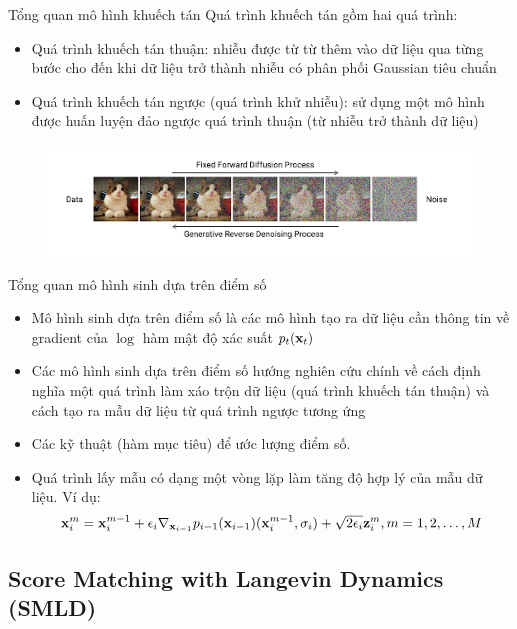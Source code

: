 \documentclass[10pt]{beamer}
\theoremstyle{remark}
\numberwithin{algocf}{section}
\numberwithin{equation}{section}
\numberwithin{dl}{section}
\numberwithin{figure}{section}
\begin{document}
\begin{frame}{Tổng quan mô hình khuếch tán}
	Quá trình khuếch tán gồm hai quá trình:
	\begin{itemize}
		\item Quá trình khuếch tán thuận: nhiễu được từ từ thêm vào dữ liệu qua từng bước cho đến khi dữ liệu trở thành nhiễu có phân phối Gaussian tiêu chuẩn
		\item Quá trình khuếch tán ngược (quá trình khử nhiễu): sử dụng một mô hình được huấn luyện đảo ngược quá trình thuận (từ nhiễu trở thành dữ liệu)
	\end{itemize}
	\begin{figure}[H]
		\centering
		\includegraphics[width=0.9\linewidth]{figures/Fixed_Forward_Diffusion_Process.png}
	\end{figure}
\end{frame}

\begin{frame}{Tổng quan mô hình sinh dựa trên điểm số}
	\begin{itemize}
		\item Mô hình sinh dựa trên điểm số là các mô hình tạo ra dữ liệu cần thông tin về gradient của $\log$ hàm mật độ xác suất $p_t(\bold{x}_t)$
		\item Các mô hình sinh dựa trên điểm số hướng nghiên cứu chính về cách định nghĩa một quá trình làm xáo trộn dữ liệu (quá trình khuếch tán thuận) và cách tạo ra mẫu dữ liệu từ quá trình ngược tương ứng
		\item Các kỹ thuật (hàm mục tiêu) để ước lượng điểm số.
		\item Quá trình lấy mẫu có dạng một vòng lặp làm tăng độ hợp lý của mẫu dữ liệu. Ví dụ:
		\begin{equation*}
			\bold{x}_i^m = \bold{x}_i^{m-1} + \epsilon_i \nabla_{\bold{x}_{i-1}} p_{i-1}(\bold{x}_{i-1}) (\bold{x}_i^{m-1}, \sigma_i) + \sqrt{2 \epsilon_i} \bold{z}_i^m, m = 1, 2, \dots, M
		\end{equation*}
	\end{itemize}
\end{frame}

\subsection{Score Matching with Langevin Dynamics (SMLD)}
\end{document}
